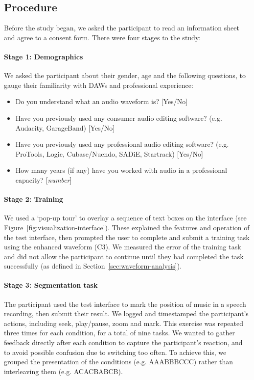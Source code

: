\subsection{Procedure}
Before the study began, we asked the participant to read an information sheet and agree to a consent form. There were
four stages to the study:

\paragraph{Stage 1: Demographics}
We asked the participant about their gender, age and the following questions, to gauge their familiarity with DAWs and
professional experience:

{\singlespacing
\begin{itemize}
  \item Do you understand what an audio waveform is? [Yes/No]
  \item Have you previously used any consumer audio editing software? (e.g.  Audacity, GarageBand) [Yes/No]
  \item Have you previously used any professional audio editing software? (e.g.  ProTools, Logic, Cubase/Nuendo, SADiE,
    Startrack) [Yes/No]
  \item How many years (if any) have you worked with audio in a professional capacity? [\textit{number}]
\end{itemize}
}

\paragraph{Stage 2: Training}
We used a `pop-up tour' to overlay a sequence of text boxes on the interface (see
Figure~\ref{fig:visualization-interface}). These explained the features and operation of the test interface, then
prompted the user to complete and submit a training task using the enhanced waveform (C3). We measured the error of the
training task and did not allow the participant to continue until they had completed the task successfully (as defined
in Section~\ref{sec:waveform-analysis}).

\paragraph{Stage 3: Segmentation task}
The participant used the test interface to mark the position of music in a speech recording, then submit their result.
We logged and timestamped the participant's actions, including seek, play/pause, zoom and mark.  This exercise was
repeated three times for each condition, for a total of nine tasks.  We wanted to gather feedback directly after each
condition to capture the participant's reaction, and to avoid possible confusion due to switching too often.  To
achieve this, we grouped the presentation of the conditions (e.g. AAABBBCCC) rather than interleaving them (e.g.
ACACBABCB).

